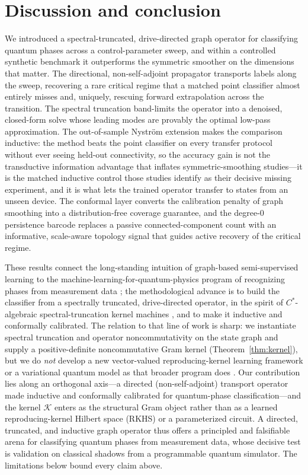 \documentclass[aps,prresearch,reprint,amsmath,amssymb,nofootinbib,superscriptaddress,floatfix]{revtex4-2}
\theoremstyle{definition}
\theoremstyle{remark}
\theoremstyle{plain}
\begin{document}
\section{Discussion and conclusion}
\label{sec:discussion}
We introduced a spectral-truncated, drive-directed graph operator for classifying quantum phases across a
control-parameter sweep, and within a controlled synthetic benchmark it outperforms the symmetric smoother
on the dimensions that matter. The directional, non-self-adjoint propagator transports labels along the
sweep, recovering a rare critical regime that a matched point classifier almost entirely misses and,
uniquely, rescuing forward extrapolation across the transition. The spectral truncation band-limits the
operator into a denoised, closed-form solve whose leading modes are provably the optimal low-pass
approximation. The out-of-sample Nystr\"om extension makes the comparison inductive: the method beats the
point classifier on every transfer protocol without ever seeing held-out connectivity, so the accuracy gain
is not the transductive information advantage that inflates
symmetric-smoothing studies---it is the matched inductive control those studies identify as their decisive
missing experiment, and it is what lets the trained operator transfer to states from an unseen device. The
conformal layer converts the calibration penalty of graph smoothing into a distribution-free coverage
guarantee, and the degree-$0$ persistence barcode replaces a passive connected-component count with an
informative, scale-aware topology signal that guides active recovery of the critical regime.

These results connect the long-standing intuition of graph-based semi-supervised learning
\cite{zhou2004local,zhu2002labelprop} to the machine-learning-for-quantum-physics program of recognizing
phases from measurement data \cite{carrasquilla2017ml,carleo2019rmp,biamonte2017qml}; the methodological
advance is to build the classifier from a spectrally truncated, drive-directed operator, in the spirit of
$C^*$-algebraic spectral-truncation kernel machines
\cite{hashimoto2026spectral,vansuijlekom2021spectral,connes2021truncations}, and to make it inductive and
conformally calibrated. The relation to that line of work is sharp: we instantiate spectral truncation and
operator noncommutativity on the state graph and supply a positive-definite noncommutative Gram kernel
(Theorem~\ref{thm:kernel}), but we do \emph{not} develop a new vector-valued reproducing-kernel learning
framework or a variational quantum model as that broader program does
\cite{havlicek2019,schuld2019,patti2022multibasis,cerezo2021vqa}. Our contribution lies along an orthogonal
axis---a directed (non-self-adjoint) transport operator made inductive and conformally calibrated for
quantum-phase classification---and the kernel $\mathcal K$ enters as the structural Gram object rather than
as a learned reproducing-kernel Hilbert space (RKHS) or a parameterized circuit. A directed, truncated, and
inductive graph operator thus offers a principled and falsifiable arena for classifying quantum phases from
measurement data, whose decisive test is validation on classical shadows from a programmable quantum
simulator. The limitations below bound every claim above.
\end{document}
